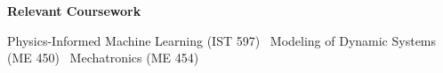 \begin{center}
    \textbf{Relevant Coursework}
\end{center}

Physics-Informed Machine Learning (IST 597) \textbullet\ Modeling of Dynamic Systems (ME 450) \textbullet\ Mechatronics (ME 454)
